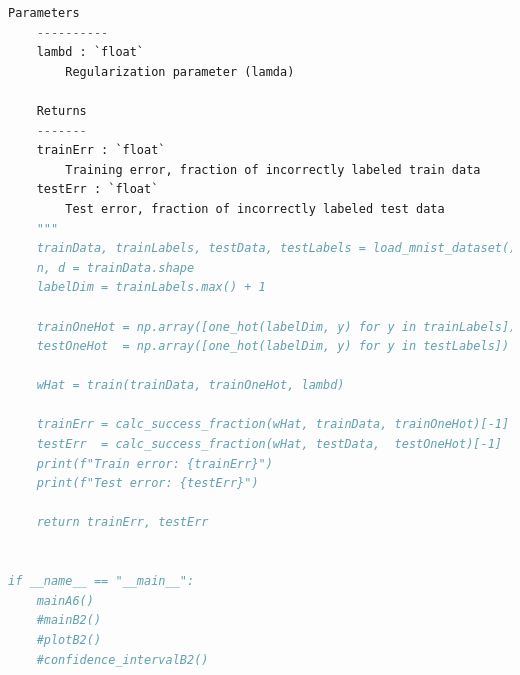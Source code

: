 \documentclass{article}
\newcommand{\1}{\mathbf{1}}
\begin{document}
\begin{enumerate}
\begin{lstlisting}[language=Python]
    Parameters
    ----------
    lambd : `float`
        Regularization parameter (lamda)

    Returns
    -------
    trainErr : `float`
        Training error, fraction of incorrectly labeled train data
    testErr : `float`
        Test error, fraction of incorrectly labeled test data
    """
    trainData, trainLabels, testData, testLabels = load_mnist_dataset()
    n, d = trainData.shape
    labelDim = trainLabels.max() + 1 

    trainOneHot = np.array([one_hot(labelDim, y) for y in trainLabels])
    testOneHot  = np.array([one_hot(labelDim, y) for y in testLabels])

    wHat = train(trainData, trainOneHot, lambd)

    trainErr = calc_success_fraction(wHat, trainData, trainOneHot)[-1]
    testErr  = calc_success_fraction(wHat, testData,  testOneHot)[-1]
    print(f"Train error: {trainErr}")
    print(f"Test error: {testErr}")

    return trainErr, testErr


if __name__ == "__main__":
    mainA6()
    #mainB2()
    #plotB2()
    #confidence_intervalB2()

\end{lstlisting}
    
    
    
\end{enumerate}{}



\newpage
\end{document}
